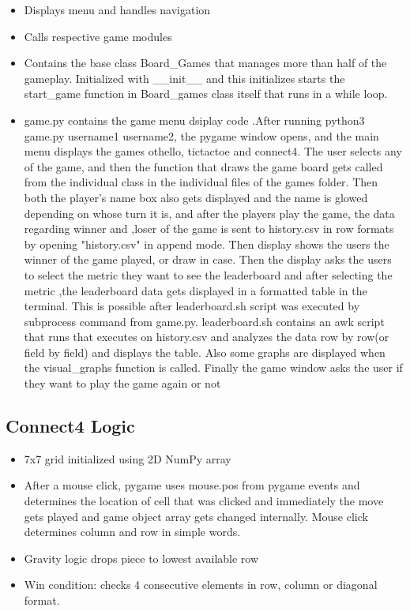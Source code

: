 \documentclass[12pt]{article}
\begin{document}
\begin{itemize}
    \item Displays menu and handles navigation
    \item Calls respective game modules
    \item Contains the base class Board\_Games that manages more than half of the gameplay. Initialized with \_\_init\_\_ and this initializes starts the start\_game function in Board\_games class itself that runs in a while loop.
    \item game.py contains the game menu dsiplay code .After running python3 game.py username1 username2, the pygame window opens, and the main menu displays the games othello, tictactoe and connect4. The user selects any of the game, and then the function that draws the game board gets called from the individual class in the individual files of the games folder. Then both the player's name box also gets displayed and the name is glowed depending on whose turn it is, and after the players play the game, the data regarding winner and ,loser of the game is sent to history.csv in row formats by opening "history.csv" in append mode. Then display shows the users the winner of the game played, or draw in case. Then the display asks the users to select the metric they want to see the leaderboard and after selecting the metric ,the leaderboard data gets displayed in a formatted table in the terminal. This is possible after leaderboard.sh script was executed by subprocess command from game.py. leaderboard.sh contains an awk script that runs that executes on history.csv and analyzes the data row by row(or field by field) and displays the table. Also some graphs are displayed when the visual\_graphs function is called. Finally the game window asks the user if they want to play the game again or not
\end{itemize}
\subsection{Connect4 Logic}

\begin{itemize}
    \item 7x7 grid initialized using 2D NumPy array
    \item After a mouse click, pygame uses mouse.pos from pygame events and determines the location of cell that was clicked and immediately the move gets played and game object array gets changed internally. Mouse click determines column and row in simple words.
    \item Gravity logic drops piece to lowest available row
    \item Win condition: checks 4 consecutive elements in row, column or diagonal format.
\end{itemize}
\end{document}
